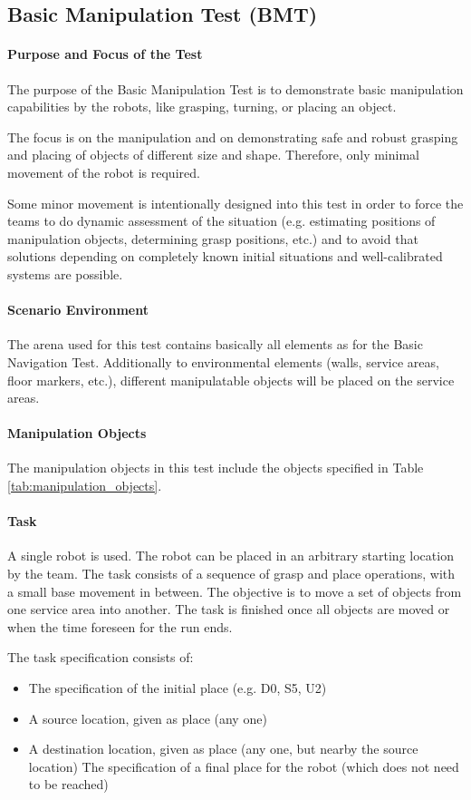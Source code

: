 \subsection{Basic Manipulation Test (BMT)}

\paragraph{Purpose and Focus of the Test}
The purpose of the Basic Manipulation Test is to demonstrate basic manipulation capabilities by the robots, like grasping, turning, or placing an object.
\par
The focus is on the manipulation and on demonstrating safe and robust grasping and placing of objects of different size and shape. Therefore, only minimal movement of the robot is required.
\par
Some minor movement is intentionally designed into this test in order to force the teams to do dynamic assessment of the situation (e.g. estimating positions of manipulation objects, determining grasp positions, etc.) and to avoid that solutions depending on completely known initial situations and well-calibrated systems are possible.

\paragraph{Scenario Environment}
The arena used for this test contains basically all elements as for the Basic Navigation Test. Additionally to environmental elements (walls, service areas, floor markers, etc.), different manipulatable objects will be placed on the service areas.

\paragraph{Manipulation Objects}
The manipulation objects in this test include the objects specified in Table \ref{tab:manipulation_objects}.

\paragraph{Task}
A single robot is used. The robot can be placed in an arbitrary starting location by the team. The task consists of a sequence of grasp and place operations, with a small base movement in between. The objective is to move a set of objects from one service area into another. The task is finished once all objects are moved or when the time foreseen for the run ends.
\par
The task specification consists of:
\begin{itemize}
	\item The specification of the initial place (e.g. D0, S5, U2)
	\item A source location, given as place (any one)
	\item A destination location, given as place (any one, but nearby the source location)
The specification of a final place for the robot (which does not need to be reached)
\end{itemize}

